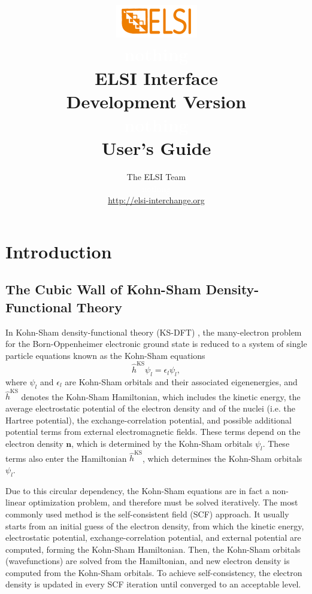 \documentclass{report}
\begin{document}
\title{\includegraphics[scale=0.07]{elsi_logo.png}\\ \textcolor{white}{nothing}\\ \textbf{ELSI Interface\\ Development Version\\ \textcolor{white}{nothing} \\ User's Guide}}
\author{The ELSI Team\\ \textcolor{white}{nothing}\\ \url{http://elsi-interchange.org}}
\maketitle

\tableofcontents

\chapter{Introduction}
\section{The Cubic Wall of Kohn-Sham Density-Functional Theory}
\label{sec:ksdft}
In Kohn-Sham density-functional theory (KS-DFT) \cite{ks_kohn_1965}, the many-electron problem for the Born-Oppenheimer electronic ground state is reduced to a system of single particle equations known as the Kohn-Sham equations
\begin{equation}
\label{eq:ks}
\hat{h}^\text{KS} \psi_l = \epsilon_l \psi_l ,
\end{equation}
where $\psi_l$ and $\epsilon_l$ are Kohn-Sham orbitals and their associated eigenenergies, and $\hat{h}^\text{KS}$ denotes the Kohn-Sham Hamiltonian, which includes the kinetic energy, the average electrostatic potential of the electron density and of the nuclei (i.e. the Hartree potential), the exchange-correlation potential, and possible additional potential terms from external electromagnetic fields. These terms depend on the electron density $\boldsymbol{n}$, which is determined by the Kohn-Sham orbitals $\psi_l$. These terms also enter the Hamiltonian $\hat{h}^\text{KS}$, which determines the Kohn-Sham orbitals $\psi_l$.

Due to this circular dependency, the Kohn-Sham equations are in fact a non-linear optimization problem, and therefore must be solved iteratively. The most commonly used method is the self-consistent field (SCF) approach. It usually starts from an initial guess of the electron density, from which the kinetic energy, electrostatic potential, exchange-correlation potential, and external potential are computed, forming the Kohn-Sham Hamiltonian. Then, the Kohn-Sham orbitals (wavefunctions) are solved from the Hamiltonian, and new electron density is computed from the Kohn-Sham orbitals. To achieve self-consistency, the electron density is updated in every SCF iteration until converged to an acceptable level.
\end{document}
